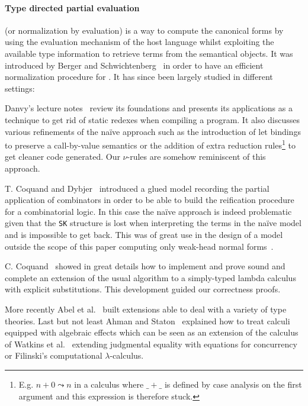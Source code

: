 \documentclass[preprint]{sigplanconf}
\begin{document}
\paragraph{Type directed partial evaluation} (or normalization by evaluation) is
a way to compute the canonical forms by using the evaluation mechanism of the host
language whilst exploiting the available type information to retrieve terms from
the semantical objects. It was introduced by Berger and Schwichtenberg~\cite{BerSch91}
in order to have an efficient normalization procedure for \minlog{}. It has since been
largely studied in different settings:

Danvy's lecture notes~\cite{TypeDirected} review its foundations and presents its
applications as a technique to get rid of static redexes when compiling a program.
It also discusses various refinements of the na\"{i}ve approach such as the introduction
of let bindings to preserve a call-by-value semantics or the addition of extra
reduction rules\footnote{E.g. $n + 0 \leadsto n$ in a calculus where $\_+\_$ is
defined by case analysis on the first argument and this expression is therefore
stuck.} to get cleaner code generated. Our $\nu$-rules are somehow reminiscent of
this approach.

T. Coquand and Dybjer~\cite{CoqDyb97} introduced a glued model recording the partial
application of combinators in order to be able to build the reification procedure
for a combinatorial logic. In this case the na\"{i}ve approach is indeed problematic
given that the \texttt{SK} structure is lost when interpreting the terms in the
na\"{i}ve model and is impossible to get back. This was of great use in the design of
a model outside the scope of this paper computing only weak-head normal forms~\cite{ForgeAcquire}.

C. Coquand~\cite{Coquand02} showed in great details how to implement and prove
sound and complete an extension of the usual algorithm to a simply-typed
lambda calculus with explicit substitutions. This development guided our
correctness proofs.

More recently Abel et al.~\cite{NbeDep1, NbeDep2} built extensions able to
deal with a variety of type theories. Last but not least Ahman and
Staton~\cite{NbeEffects, NbeEffects2} explained how to treat calculi equipped
with algebraic effects which can be seen as an extension of the calculus of
Watkins et al.~\cite{DBLP:conf/types/WatkinsCPW03} extending judgmental
equality with equations for concurrency or Filinski's computational
$\lambda$-calculus.~\cite{Filinski2001Normalization}
\end{document}
